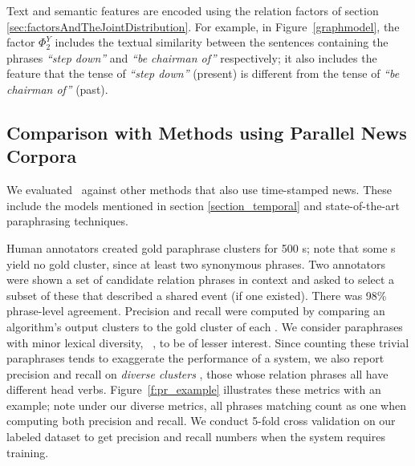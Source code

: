 Text and semantic features are encoded using the relation factors of section
\ref{sec:factorsAndTheJointDistribution}. For example, in
Figure~\ref{graphmodel}, the factor $\Phi_2^Y$ includes the textual similarity
between the sentences containing the phrases {\em ``step down''} and {\em ``be
chairman of''} respectively; it also includes the feature that the tense of
{\em ``step down''} (present) is different from the tense of {\em ``be
chairman of''} (past).


\subsection{Comparison with Methods using Parallel News Corpora}
\label{section_eval_parallel}
We evaluated \sys\ against other methods that also use time-stamped news.
These include the models mentioned in section \ref{section_temporal} and state-of-the-art paraphrasing techniques.


Human annotators created gold paraphrase clusters for 500 \bag s; note that
some \bag s yield no gold cluster, since at least two synonymous phrases. Two
annotators were shown a set of candidate relation phrases in context and asked
to select a subset of these that described a shared event (if one existed).
There was 98\% phrase-level agreement. Precision and recall were computed by
comparing an algorithm's output clusters to the gold cluster of each \eec. We
consider paraphrases with minor lexical diversity, \eg\ ,
to be of lesser interest. Since counting these trivial paraphrases tends to
exaggerate the performance of a system, we also report precision and recall on
{\em diverse clusters} \ie, those whose relation phrases all have different head
verbs. Figure~\ref{f:pr_example} illustrates these metrics with an example; note
under our diverse metrics, all phrases matching  count as one when
computing both precision and recall.  We conduct 5-fold cross validation on our
labeled dataset to get precision and recall numbers when the system requires training.

